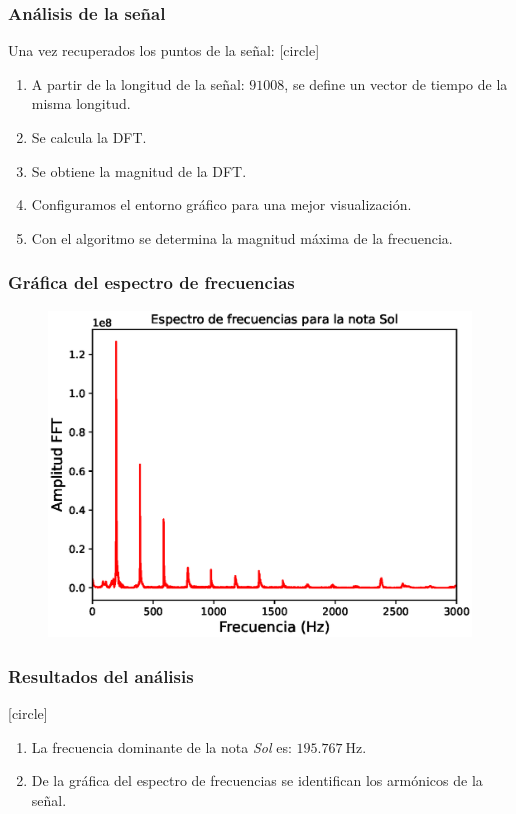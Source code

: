 \documentclass[12pt]{beamer}
\begin{document}
\begin{frame}
\frametitle{Análisis de la señal}
Una vez recuperados los puntos de la señal:
[circle]
\begin{enumerate}[<+->]
\item A partir de la longitud de la señal: $91008$, se define un vector de tiempo de la misma longitud.
\item Se calcula la DFT.
\item Se obtiene la magnitud de la DFT.
\item Configuramos el entorno gráfico para una mejor visualización.
\item Con el algoritmo se determina la magnitud máxima de la frecuencia.
\end{enumerate}
\end{frame}
\begin{frame}
\frametitle{Gráfica del espectro de frecuencias}
\begin{figure}
    \centering
    \includegraphics[scale=0.6]{Imagenes/DFT_Analisis_Senal_Audio_02.eps}
\end{figure}
\end{frame}
\begin{frame}
\frametitle{Resultados del análisis}
[circle]
\begin{enumerate}[<+->]
\item La frecuencia dominante de la nota \emph{Sol} es: $\SI{195.767}{\hertz}$.
\item De la gráfica del espectro de frecuencias se identifican los armónicos de la señal.
\end{enumerate}
\end{frame}
\end{document}
